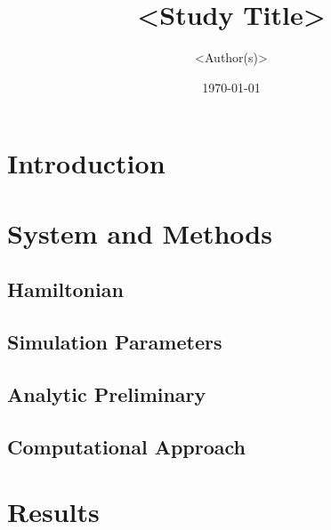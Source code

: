 \documentclass[aps,pra,twocolumn,reprint,amsmath,amssymb]{revtex4-2}
\begin{document}
\title{<Study Title>}
\author{<Author(s)>}
\date{\today}

\begin{abstract}
\end{abstract}

\maketitle

\section{Introduction}

\section{System and Methods}

\subsection{Hamiltonian}

\subsection{Simulation Parameters}

\subsection{Analytic Preliminary}

\subsection{Computational Approach}

\section{Results}
\end{document}
